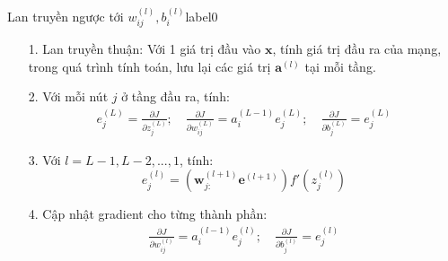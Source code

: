 
 
 
\begin{myalg}{{Lan truyền ngược tới} $w_{ij}^{(l)},
b_{i}^{(l)}$}{label0}
\begin{enumerate}
    \item[1.] Lan truyền thuận: Với 1 giá trị đầu vào $\mathbf{x}$, tính giá trị đầu
    ra của mạng, trong quá trình tính toán, lưu lại các giá trị $\mathbf{a}^{(l)}$ tại mỗi tầng.
    \item[2.] Với mỗi nút $j$ ở tầng đầu ra, tính:
    \begin{eqnarray} 
    e_j^{(L)} = \frac{\partial J}{\partial z_j^{(L)}}; \quad 
    \frac{\partial J}{\partial w_{ij}^{(L)}} = a_i^{(L-1)}e_j^{(L)}; \quad  
    \frac{\partial J}{\partial b_{j}^{(L)}} = e_j^{(L)} 
    \end{eqnarray} 

    \item[3.]  Với $l = L-1, L-2, ..., 1$, tính: 
    \begin{equation} 
    e_j^{(l)} = \left( \mathbf{w}_{j:}^{(l+1)} \mathbf{e}^{(l+1)} \right) f'(z_j^{(l)}) 
    \end{equation} 

    \item[4.] Cập nhật gradient cho từng thành phần:
    \begin{eqnarray} 
    \frac{\partial J}{\partial w_{ij}^{(l)}} = a_i^{(l-1)} e_j^{(l)}; \quad 
    \frac{\partial J}{\partial b_{j}^{(l)}} = e_j^{(l)} 
    \end{eqnarray} 
\end{enumerate}
\end{myalg}
 
 
 
